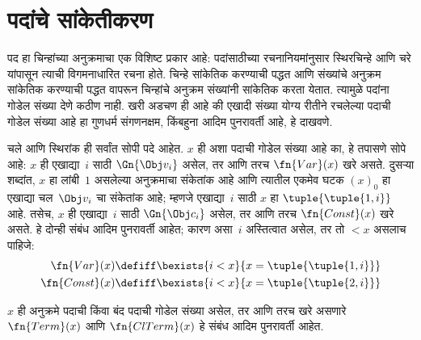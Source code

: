 \section{पदांचे सांकेतीकरण}\label{inc:art:trm:sec}

\begin{explain}
पद हा चिन्हांच्या अनुक्रमाचा एक विशिष्ट प्रकार आहे: पदांसाठीच्या
रचनानियमांनुसार स्थिरचिन्हे आणि चरे यांपासून त्याची विगमनाधारित
रचना होते. चिन्हे सांकेतिक करण्याची पद्धत आणि संख्यांचे अनुक्रम
सांकेतिक करण्याची पद्धत वापरून चिन्हांचे अनुक्रम संख्यांनी सांकेतिक
करता येतात. त्यामुळे पदांना गोडेल संख्या देणे कठीण नाही. खरी
अडचण ही आहे की एखादी संख्या योग्य रीतीने रचलेल्या पदाची गोडेल
संख्या आहे हा गुणधर्म संगणनक्षम, किंबहुना आदिम पुनरावर्ती आहे, हे दाखवणे.
\end{explain}

चले आणि स्थिरांक ही सर्वांत सोपी पदे आहेत. $x$ ही
अशा पदाची गोडेल संख्या आहे का, हे तपासणे सोपे आहे:
$x$ ही एखाद्या~$i$ साठी $\Gn{\Obj v_i}$ असेल, तर आणि तरच
$\fn{Var}(x)$ खरे असते. दुसऱ्या शब्दांत, $x$ हा लांबी~$1$
असलेल्या अनुक्रमाचा संकेतांक आहे आणि त्यातील एकमेव घटक $(x)_0$
हा एखाद्या चल~$\Obj v_i$ चा संकेतांक आहे; म्हणजे एखाद्या~$i$
साठी $x$ हा $\tuple{\tuple{1, i}}$ आहे. तसेच, $x$ ही एखाद्या~$i$
साठी $\Gn{\Obj c_i}$ असेल, तर आणि तरच $\fn{Const}(x)$ खरे असते.
हे दोन्ही संबंध आदिम पुनरावर्ती आहेत; कारण असा~$i$ अस्तित्वात
असेल, तर तो $< x$ असलाच पाहिजे:
\begin{align*}
  \fn{Var}(x) & \defiff \bexists{i<x}{x = \tuple{\tuple{1, i}}}\\
  \fn{Const}(x) & \defiff \bexists{i<x}{x = \tuple{\tuple{2, i}}}
\end{align*}

\begin{prop}
\label{inc:art:trm:prop:term-primrec}
$x$ ही अनुक्रमे पदाची किंवा बंद पदाची गोडेल संख्या असेल, तर आणि तरच
खरे असणारे $\fn{Term}(x)$ आणि $\fn{ClTerm}(x)$ हे संबंध आदिम पुनरावर्ती आहेत.
\end{prop}

